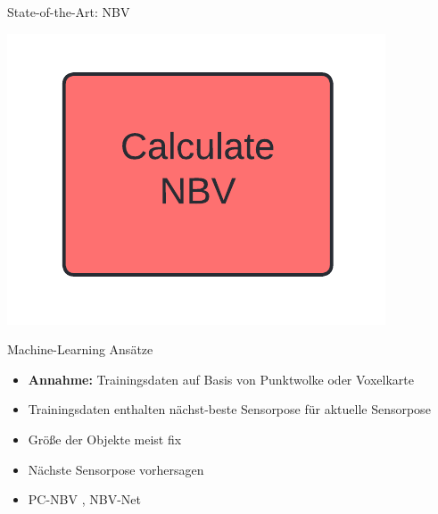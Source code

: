 \documentclass{beamer}
\begin{document}
\begin{frame}{State-of-the-Art: NBV}
	\vspace{-1cm}
	\hfill
	\begin{minipage}{0.2\textwidth}
		\includegraphics[width=\textwidth]{Graphics/nbv_flow.png}
	\end{minipage}
	\vspace{-0.5cm}
	\begin{block}{Machine-Learning Ansätze}
		\begin{itemize}
			\item \textbf{Annahme:} Trainingsdaten auf Basis von Punktwolke oder Voxelkarte
			\item Trainingsdaten enthalten nächst-beste Sensorpose für aktuelle Sensorpose
			\item Größe der Objekte meist fix
			\item Nächste Sensorpose vorhersagen
			\item PC-NBV \cite{zeng_pc-nbv_2020}, NBV-Net \cite{mendoza_supervised_2020}

		\end{itemize}
	\end{block}
\end{frame}
\end{document}
